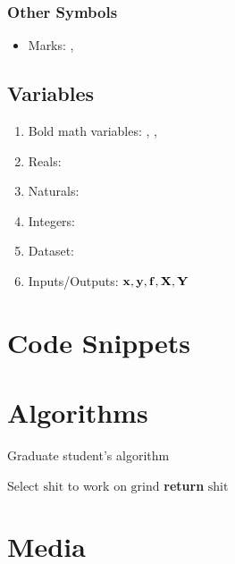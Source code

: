 \documentclass{article}
\begin{document}
\subsubsection{Other Symbols}

\begin{itemize}
	\item Marks: \cmark, \xmark
\end{itemize}

\subsection{Variables}
\begin{enumerate}%
\item Bold math variables: \mbf{\Sigma}, ,
\item Reals: \reals
\item Naturals: \naturals
\item Integers: \ints
\item Dataset: \dset
\item Inputs/Outputs: ${\boldsymbol{\mathbf{x}}},{\boldsymbol{\mathbf{y}}},{\boldsymbol{\mathbf{f}}},{\boldsymbol{\mathbf{X}}},{\boldsymbol{\mathbf{Y}}}$
\end{enumerate}

\section{Code Snippets}



\section{Algorithms}

\begin{algorithm}
\caption{Graduate student’s algorithm}\label{euclid}
\begin{algorithmic}[1]
   \State Select $\mathrm{shit}$ to work on
      \State $\mathrm{grind}$
   \EndWhile
   \State \textbf{return} $\mathrm{shit}$
\EndProcedure
\end{algorithmic}
\end{algorithm}

\section{Media}
\end{document}
